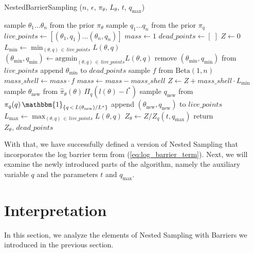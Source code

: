 \documentclass[12pt, a4paper]{report}
\begin{document}
\begin{algorithm}
    \caption[Nested Sampling with the log barrier term.]{NestedBarrierSampling ($n$, $\epsilon$, $\pi_\theta$, $L_\theta$, $t$, $q_{\textrm{max}}$)}
    \label{alg:barriersampling}
    \begin{algorithmic}
        \State sample $\theta_1 ... \theta_n$ from the prior $\pi_\theta$
        \State sample $q_1 ... q_n$ from the prior $\pi_q$
        \State $live\_points \gets [ (\theta_1, q_1) ... (\theta_n, q_n) ]$
        \State $mass \gets 1$
        \State $dead\_points \gets [ \; ]$
        \State $Z \gets 0$
        \Repeat
            \State $L_{\textrm{min}} \gets \min_{(\theta,q) \, \in \, live\_points} L(\theta, q)$ 
            \State $(\theta_{\textrm{min}}, q_{\textrm{min}}) \gets \textrm{argmin}_{(\theta,q) \, \in \, live\_points} L(\theta, q)$ 
            \State remove $(\theta_{\textrm{min}}, q_{\textrm{min}})$ from $live\_points$
            \State append $\theta_{\textrm{min}}$ to $dead\_points$
            \State sample $f$ from  $\textrm{Beta}(1, n)$
            \State $mass\_shell \gets mass \cdot f$
            \State $mass \gets mass - mass\_shell$
            \State $Z \gets Z + mass\_shell \cdot L_{\textrm{min}}$
            \State sample $\theta_{\textrm{new}}$ from $\hat{\pi}_\theta(\theta) \, \Pi_q(l(\theta) - l^*)$
            \State sample $q_{\textrm{new}}$ from $\pi_q(q) \, \mathbbm{1}_{\{q \,<\, L(\theta_{\textrm{new}}) / L^*\}}$
            \State append $(\theta_{\textrm{new}}, q_{\textrm{new}})$ to $live\_points$
            \State $L_{\textrm{max}} \gets \max_{(\theta,q) \, \in \, live\_points} L(\theta, q)$ 
        \State $Z_\theta \gets Z / Z_q(t, q_{\textrm{max}})$
        \State return $Z_\theta,\, dead\_points$
    \end{algorithmic}
\end{algorithm}

With that, we have successfully defined a version of Nested Sampling that incorporates the log barrier term from (\ref{eq:log_barrier_term}).
Next, we will examine the newly introduced parts of the algorithm, namely the auxiliary variable $q$ and the parameters $t$ and $q_{\textrm{max}}$.

\FloatBarrier
\section{Interpretation}
In this section, we analyze the elements of Nested Sampling with Barriers we introduced in the previous section.
\end{document}
